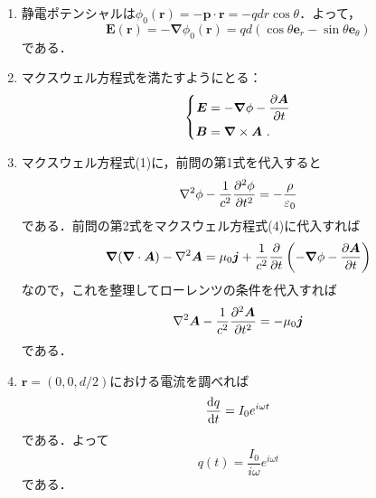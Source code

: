 \documentclass[a4paper,pdflatex,ja=standard]{bxjsarticle}
\begin{document}
\begin{enumerate}
  \item 
  静電ポテンシャルは$\phi_{0}(\bm{r})=-\bm{p}\cdot\bm{r}=-qdr\cos\theta$．よって，
  \begin{equation}
    \bm{E}(\bm{r})
    =
    -\bm{\nabla}\phi_{0}(\bm{r})
    =
    qd(\cos\theta\bm{e}_{r}-\sin\theta\bm{e}_{\theta})
  \end{equation}
  である．

  \item 
  マクスウェル方程式を満たすようにとる：
  \begin{equation}
    \left\{
      \begin{alignedat}{1}
        \bm{E}
        &=
        -\bm{\nabla}\phi
        -
        \pdv{\bm{A}}{t}
        \\
        \bm{B}
        &=
        \bm{\nabla}\times\bm{A}
        \ .
      \end{alignedat}
    \right.
  \end{equation}

  \item 
  マクスウェル方程式(1)に，前問の第1式を代入すると
  \begin{equation}
    \nabla^2\phi
    -
    \frac{1}{c^2}\pdv[2]{\phi}{t}
    =
    -\frac{\rho}{\varepsilon_{0}}
  \end{equation}
  である．前問の第2式をマクスウェル方程式(4)に代入すれば
  \begin{equation}
    \bm{\nabla}(\bm{\nabla}\cdot\bm{A})
    -
    \nabla^2\bm{A}
    =
    \mu_{0}\bm{j}
    +
    \frac{1}{c^2}\pdv{}{t}
    \left(  
      -\bm{\nabla}\phi
      -
      \pdv{\bm{A}}{t}
    \right)
  \end{equation}
  なので，これを整理してローレンツの条件を代入すれば
  \begin{equation}
    \nabla^2
    \bm{A}
    -
    \frac{1}{c^2}\pdv[2]{\bm{A}}{t}
    =
    -\mu_{0}\bm{j}
  \end{equation}
  である．

  \item 
  $\bm{r}=(0,0,d/2)$における電流を調べれば
  \begin{equation}
    \dv{q}{t}
    =
    I_{0}e^{i\omega t}
  \end{equation}
  である．よって
  \begin{equation}
    q(t)
    =
    \frac{I_{0}}{i\omega}e^{i\omega t}
  \end{equation}
  である．


\end{enumerate}
\end{document}
